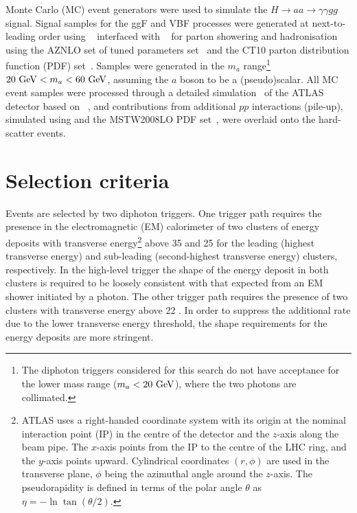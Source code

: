 Monte Carlo (MC) event generators were used to simulate the $H\to aa \to \gamma\gamma gg$ signal.
Signal samples for the ggF and VBF processes were generated at next-to-leading order using 
\POWHEGBOX{}~\cite{Nason:2004rx,Frixione:2007vw,Alioli:2010xd} interfaced with \PYTHIA{}~\cite{Sjostrand:2014zea} for parton showering and hadronisation using the AZNLO set of tuned parameters set~\cite{STDM-2012-23} and the CT10 parton distribution function (PDF) set~\cite{Lai:2010vv}.
Samples were generated in the $m_a$ range\footnote{The diphoton triggers considered for this
search do not have acceptance for the lower mass range ($m_a<20~\mathrm{GeV}{}$), where the two photons are collimated.} 
$20~\mathrm{GeV}{} < m_a < 60~\mathrm{GeV}{}$, assuming the $a$ boson to be a (pseudo)scalar.
All MC event samples were processed through a detailed simulation~\cite{SOFT-2010-01} of the ATLAS detector
based on \geantFour{}~\cite{Agostinelli:2002hh}, and contributions from additional $pp$ interactions (pile-up), simulated using
\PYTHIA{} and the MSTW2008LO PDF set~\cite{Martin:2009iq}, were overlaid onto the hard-scatter events.

\section{Selection criteria}

Events are selected by two diphoton triggers.
One trigger path requires the presence in the electromagnetic (EM) calorimeter of two clusters of energy
deposits with transverse energy\footnote{ATLAS uses a right-handed coordinate system with its origin 
  at the nominal interaction point (IP) in the centre of the detector and the $z$-axis along the beam pipe. The $x$-axis points from the IP to the centre of the LHC ring, 
  and the $y$-axis points upward. Cylindrical coordinates $(r,\phi)$ are used in the transverse plane, $\phi$ being the azimuthal angle around the $z$-axis. 
  The pseudorapidity is defined in terms of the polar angle $\theta$ as $\eta=-\ln\tan(\theta/2)$.}
above 35 \GeV{} and 25 \GeV{} for the leading (highest transverse energy) and sub-leading
(second-highest transverse energy) clusters, respectively. In the high-level trigger the shape of the energy
deposit in both clusters is required to be loosely consistent with that expected from an EM shower initiated by a photon.
The other trigger path requires the presence of two clusters with transverse energy above 22 \GeV{}.
In order to suppress the additional rate due to the lower transverse energy threshold, the shape requirements for the energy deposits are
more stringent.

